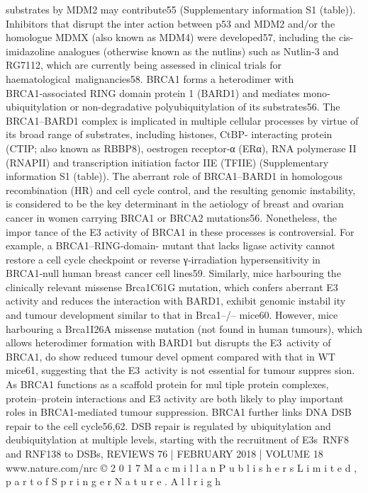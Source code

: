 substrates by MDM2 may contribute55 (Supplementary
information S1 (table)). Inhibitors that disrupt the inter­
action between p53 and MDM2 and/or the homologue
MDMX (also known as MDM4) were developed57,
including the cis-imidazoline analogues (otherwise
known as the nutlins) such as Nutlin‑3 and RG7112,
which are currently being assessed in clinical trials for
haematological malignancies58.
BRCA1 forms a heterodimer with BRCA1‑associated
RING domain protein 1 (BARD1) and mediates mono­
ubiquitylation or non-degradative polyubiquitylation
of its substrates56. The BRCA1–BARD1 complex is
implicated in multiple cellular processes by virtue of
its broad range of substrates, including histones, CtBP-
interacting protein (CTIP; also known as RBBP8),
oestrogen ­receptor‑α (ERα), RNA polymerase II
(RNAPII) and transcription initiation factor IIE (TFIIE)
(Supplementary information S1 (table)). The aberrant
role of BRCA1–BARD1 in homologous recombination
(HR) and cell cycle control, and the resulting genomic
instability, is considered to be the key determinant in the
aetiology of breast and ovarian cancer in women carrying
BRCA1 or BRCA2 mutations56. Nonetheless, the impor­
tance of the E3 activity of BRCA1 in these processes is
controversial. For example, a BRCA1–RING-domain-
mutant that lacks ligase activity cannot restore a cell cycle
checkpoint or reverse γ‑irradiation hypersensitivity in
BRCA1‑null human breast cancer cell lines59. Similarly,
mice harbouring the clinically relevant missense Brca1C61G
mutation, which confers aberrant E3 activity and reduces
the interaction with BARD1, exhibit genomic instabil­
ity and tumour development similar to that in Brca1–/–
mice60. However, mice harbouring a Brca1I26A missense
mutation (not found in human tumours), which allows
heterodimer formation with BARD1 but disrupts the
E3 activity of BRCA1, do show reduced tumour devel­
opment compared with that in WT mice61, suggesting
that the E3 activity is not essential for tumour suppres­
sion. As BRCA1 functions as a scaffold protein for mul­
tiple protein complexes, protein–protein interactions
and E3 activity are both likely to play ­important roles in
BRCA1‑mediated tumour suppression.
BRCA1 further links DNA DSB repair to the cell
cycle56,62. DSB repair is regulated by ubiquitylation
and deubiquitylation at multiple levels, starting with
the recruitment of E3s RNF8 and RNF138 to DSBs,
REVIEWS
76 | FEBRUARY 2018 | VOLUME 18
www.nature.com/nrc
©
 2
0
1
7
 M
a
c
m
i
l
l
a
n
 P
u
b
l
i
s
h
e
r
s
 L
i
m
i
t
e
d
,
 p
a
r
t
 o
f
 S
p
r
i
n
g
e
r
 N
a
t
u
r
e
.
 A
l
l
 r
i
g
h
